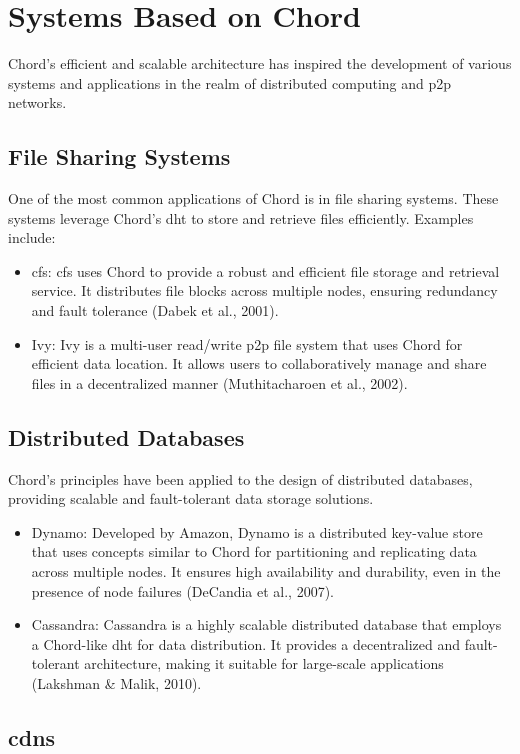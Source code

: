 \chapter{Systems Based on Chord}
Chord's efficient and scalable architecture has inspired the development of various systems and applications in the realm of distributed computing and \gls{p2p} networks.

\section{File Sharing Systems}
One of the most common applications of Chord is in file sharing systems.
These systems leverage Chord's \gls{dht} to store and retrieve files efficiently.
Examples include:
\begin{itemize}
    \item \gls{cfs}: \gls{cfs} uses Chord to provide a robust and efficient file storage and retrieval service.
    It distributes file blocks across multiple nodes, ensuring redundancy and fault tolerance (Dabek et al., 2001).
    \item Ivy: Ivy is a multi-user read/write \gls{p2p} file system that uses Chord for efficient data location.
    It allows users to collaboratively manage and share files in a decentralized manner (Muthitacharoen et al., 2002).
\end{itemize}

\section{Distributed Databases}
Chord's principles have been applied to the design of distributed databases, providing scalable and fault-tolerant data storage solutions.
\begin{itemize}
    \item Dynamo: Developed by Amazon, Dynamo is a distributed key-value store that uses concepts similar to Chord for partitioning and replicating data across multiple nodes.
    It ensures high availability and durability, even in the presence of node failures (DeCandia et al., 2007).
    \item Cassandra: Cassandra is a highly scalable distributed database that employs a Chord-like \gls{dht} for data distribution.
    It provides a decentralized and fault-tolerant architecture, making it suitable for large-scale applications (Lakshman \& Malik, 2010).
\end{itemize}

\section{\glspl{cdn}}

